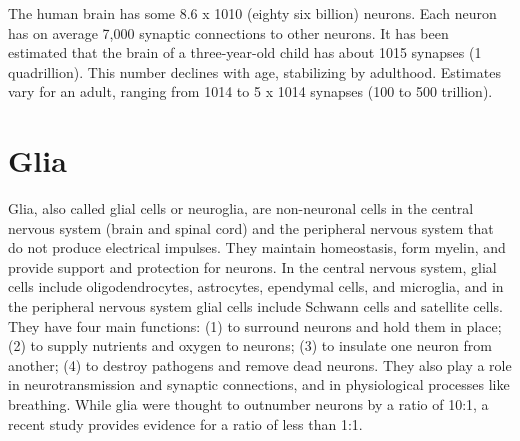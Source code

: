 The human brain has some 8.6 x 1010 (eighty six billion) neurons. Each neuron has on average 7,000 synaptic connections to other neurons. It has been estimated that the brain of a three-year-old child has about 1015 synapses (1 quadrillion). This number declines with age, stabilizing by adulthood. Estimates vary for an adult, ranging from 1014 to 5 x 1014 synapses (100 to 500 trillion).

\hypertarget{glia}{%
\section{Glia}\label{glia}}

Glia, also called glial cells or neuroglia, are non-neuronal cells in the central nervous system (brain and spinal cord) and the peripheral nervous system that do not produce electrical impulses. They maintain homeostasis, form myelin, and provide support and protection for neurons. In the central nervous system, glial cells include oligodendrocytes, astrocytes, ependymal cells, and microglia, and in the peripheral nervous system glial cells include Schwann cells and satellite cells. They have four main functions: (1) to surround neurons and hold them in place; (2) to supply nutrients and oxygen to neurons; (3) to insulate one neuron from another; (4) to destroy pathogens and remove dead neurons. They also play a role in neurotransmission and synaptic connections, and in physiological processes like breathing. While glia were thought to outnumber neurons by a ratio of 10:1, a recent study provides evidence for a ratio of less than 1:1.

